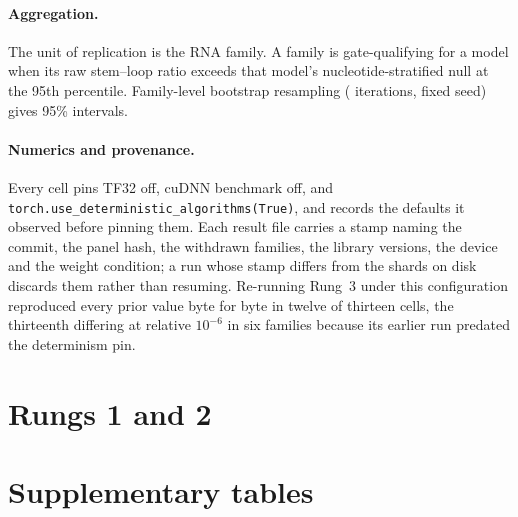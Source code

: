 \documentclass{article}
\begin{document}
\paragraph{Aggregation.} The unit of replication is the RNA family. A family is
gate-qualifying for a model when its raw stem--loop ratio exceeds that model's
nucleotide-stratified null at the 95th percentile. Family-level bootstrap
resampling (\bootstrapB{} iterations, fixed seed) gives 95\% intervals.

\paragraph{Numerics and provenance.} Every cell pins TF32 off, cuDNN benchmark
off, and \texttt{torch.use\_deterministic\_algorithms(True)}, and records the
defaults it observed before pinning them. Each result file carries a stamp
naming the commit, the panel hash, the withdrawn families, the library
versions, the device and the weight condition; a run whose stamp differs from
the shards on disk discards them rather than resuming. Re-running Rung~3 under
this configuration reproduced every prior value byte for byte in twelve of
thirteen cells, the thirteenth differing at relative $10^{-6}$ in six families
because its earlier run predated the determinism pin.

\section{Rungs 1 and 2}
\label{app:rungs12}




\section{Supplementary tables}
\label{app:supplement}












\end{document}
